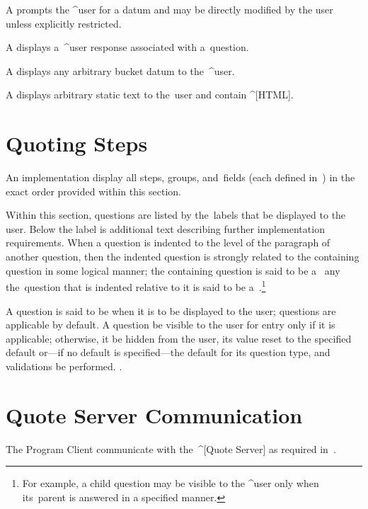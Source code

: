   \incomplete
  A  prompts the ^user for a datum and may be
  directly modified by the user unless explicitly restricted. 

  \incomplete
  A  displays a~^user response associated with
  a~question. 

  \incomplete
  A  displays any arbitrary bucket datum to
  the~^user. 

  \incomplete
  A  displays arbitrary static text to
  the~user and \may contain ^[HTML].

  \section{Quoting Steps}\label{s:program-steps}
  \incomplete
  An implementation \shall display all steps, groups, and~fields (each defined
  in~) in the exact order provided within this section.

  Within this section, questions are listed by the~labels that \shall be displayed
  to the user. Below the label is additional text describing further
  implementation requirements. When a question is indented to the level of the
  paragraph of another question, then the indented question is strongly related to
  the containing question in some logical manner; the containing question is said
  to be a~ any the~question that is
  indented relative to it is said to be a~.\footnote{For example, a child question may be visible to the ^user
  only when its~parent is answered in a specified manner.}

  \incomplete
  A question is said to be  when it is to
  be displayed to the user; questions are applicable by default. A question \shall
  be visible to the user for entry only if it is applicable; otherwise, it \shall
  be hidden from the user, its value reset to the specified default or---if no
  default is specified---the default for its question type, and validations
  \shallnot be performed. .


  \proguistepsout
\enddeptgroup


\section{Quote Server Communication}

  The Program Client \shall communicate with the~^[Quote Server] as required
  in~.


